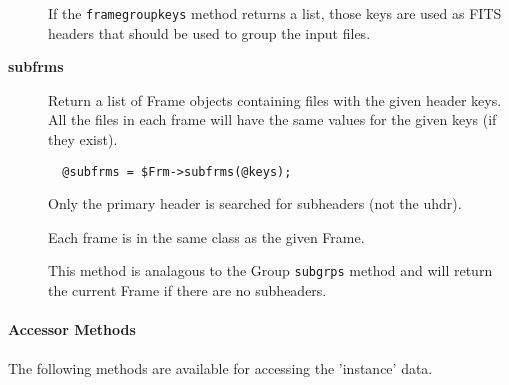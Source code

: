 \begin{description}
If the \texttt{framegroupkeys} method returns a list, those keys
are used as FITS headers that should be used to group the input
files.


\item[{\textbf{subfrms}}] \mbox{}

Return a list of Frame objects containing files with the given header
keys. All the files in each frame will have the same values for the
given keys (if they exist).

\begin{verbatim}
  @subfrms = $Frm->subfrms(@keys);
\end{verbatim}


Only the primary header is searched for subheaders (not the uhdr).



Each frame is in the same class as the given Frame.



This method is analagous to the Group \texttt{subgrps} method and will
return the current Frame if there are no subheaders.

\end{description}
\paragraph*{Accessor Methods\label{ORAC::Frame_Accessor_Methods}}


The following methods are available for accessing the
'instance' data.

